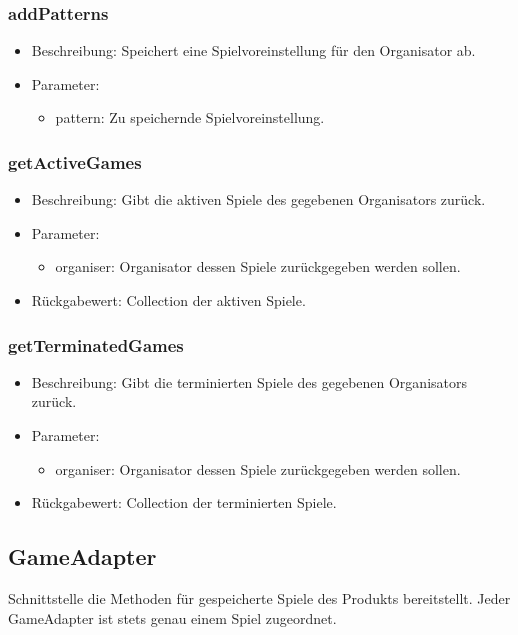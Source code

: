 \documentclass[a4paper]{scrreprt}
\begin{document}
	\subsubsection{addPatterns}
	\begin{itemize}
		\item Beschreibung: Speichert eine Spielvoreinstellung für den Organisator ab.
		\item Parameter:
		\begin{itemize}
			\item pattern: Zu speichernde Spielvoreinstellung.
		\end{itemize}
	\end{itemize}

	\subsubsection{getActiveGames}
	\begin{itemize}
		\item Beschreibung: Gibt die aktiven Spiele des gegebenen Organisators zurück.
		\item Parameter:
		\begin{itemize}
			\item organiser: Organisator dessen Spiele zurückgegeben werden sollen.
		\end{itemize}
		\item Rückgabewert: Collection der aktiven Spiele.
	\end{itemize}

	\subsubsection{getTerminatedGames}
	\begin{itemize}
		\item Beschreibung: Gibt die terminierten Spiele des gegebenen Organisators zurück.
		\item Parameter:
		\begin{itemize}
			\item organiser: Organisator dessen Spiele zurückgegeben werden sollen.
		\end{itemize}
		\item Rückgabewert: Collection der terminierten Spiele.
	\end{itemize}

	\subsection{GameAdapter}
	Schnittstelle die Methoden für gespeicherte Spiele des Produkts bereitstellt.
	Jeder GameAdapter ist stets genau einem Spiel zugeordnet.
\end{document}

